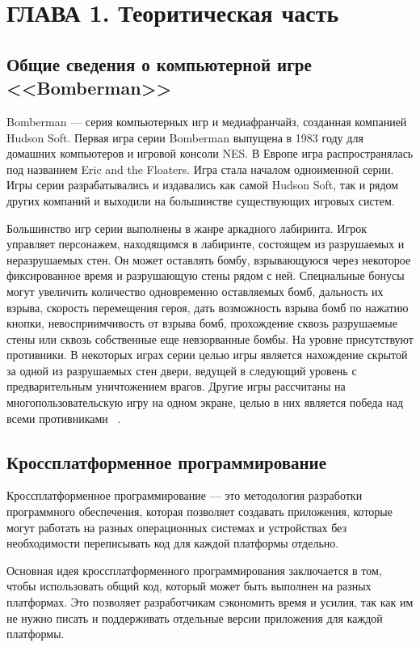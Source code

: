 \chapter{\label{ch:ch01}ГЛАВА 1. Теоритическая часть} %

\section{\label{sec:ch01/sec01} Общие сведения о компьютерной игре <<Bomberman>>}
Bomberman --- серия компьютерных игр и медиафранчайз, созданная компанией Hudson Soft. Первая игра серии Bomberman выпущена в 1983 году для домашних компьютеров и игровой консоли NES. В Европе игра распространялась под названием Eric and the Floaters. Игра стала началом одноименной серии. Игры серии разрабатывались и издавались как самой Hudson Soft, так и рядом других компаний и выходили на большинстве существующих игровых систем.

Большинство игр серии выполнены в жанре аркадного лабиринта. Игрок управляет персонажем, находящимся в лабиринте, состоящем из разрушаемых и неразрушаемых стен. Он может оставлять бомбу, взрывающуюся через некоторое фиксированное время и разрушающую стены рядом с ней. Специальные бонусы могут увеличить количество одновременно оставляемых бомб, дальность их взрыва, скорость перемещения героя, дать возможность взрыва бомб по нажатию кнопки, невосприимчивость от взрыва бомб, прохождение сквозь разрушаемые стены или сквозь собственные еще невзорванные бомбы. На уровне присутствуют противники. В некоторых играх серии целью игры является нахождение скрытой за одной из разрушаемых стен двери, ведущей в следующий уровень с предварительным уничтожением врагов. Другие игры рассчитаны на многопользовательскую игру на одном экране, целью в них является победа над всеми противниками ~\cite{wikiRUBomberman}.

\section{\label{sec:ch01/sec02} Кроссплатформенное программирование}
Кроссплатформенное программирование --- это методология разработки программного обеспечения, которая позволяет создавать приложения, которые могут работать на разных операционных системах и устройствах без необходимости переписывать код для каждой платформы отдельно.

Основная идея кроссплатформенного программирования заключается в том, чтобы использовать общий код, который может быть выполнен на разных платформах. Это позволяет разработчикам сэкономить время и усилия, так как им не нужно писать и поддерживать отдельные версии приложения для каждой платформы.

